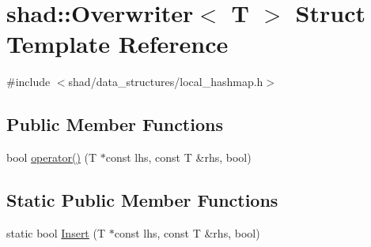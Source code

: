 \hypertarget{structshad_1_1Overwriter}{\section{shad\-:\-:Overwriter$<$ T $>$ Struct Template Reference}
\label{structshad_1_1Overwriter}
}


{\ttfamily \#include $<$shad/data\-\_\-structures/local\-\_\-hashmap.\-h$>$}

\subsection*{Public Member Functions}
\begin{DoxyCompactItemize}
\item 
bool \hyperlink{structshad_1_1Overwriter_afa430a0e2b445ff2f7bbd2b77e237bc0}{operator()} (T $\ast$const lhs, const T \&rhs, bool)
\end{DoxyCompactItemize}
\subsection*{Static Public Member Functions}
\begin{DoxyCompactItemize}
\item 
static bool \hyperlink{structshad_1_1Overwriter_a5e7bf0ee102f98373e29381e02fe133c}{Insert} (T $\ast$const lhs, const T \&rhs, bool)
\end{DoxyCompactItemize}


